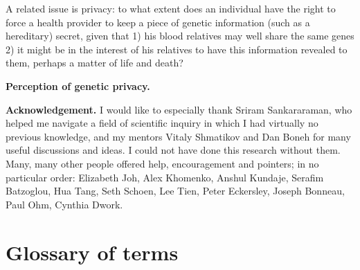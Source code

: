 \documentclass{article}
\begin{document}
A related issue is  privacy: to what extent does an individual have the right to force a health provider to keep a piece of genetic information (such as a hereditary) secret, given that 1) his blood relatives may well share the same genes 2) it might be in the interest of his relatives to have this information revealed to them, perhaps a matter of life and death?

{\bf Perception of genetic privacy.}


{\bf Acknowledgement.}
I would like to especially thank Sriram Sankararaman, who helped me navigate a field of scientific inquiry in which I had virtually no previous knowledge, and my mentors Vitaly Shmatikov and Dan Boneh for many useful discussions and ideas. I could not have done this research without them. Many, many other people offered help, encouragement and pointers; in no particular order: Elizabeth Joh, Alex Khomenko, Anshul Kundaje, Serafim Batzoglou, Hua Tang, Seth Schoen, Lee Tien, Peter Eckersley, Joseph Bonneau, Paul Ohm, Cynthia Dwork.

\section{Glossary of terms}


\end{document}
